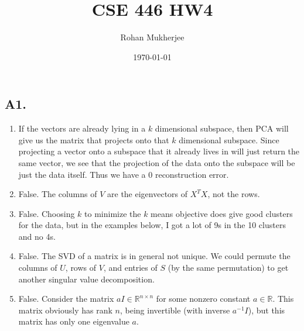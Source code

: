 \documentclass[12pt]{article}
\title{CSE 446 HW4}
\date{\today}
\author{Rohan Mukherjee}
\theoremstyle{definitionstyle}
\def\mbb#1{\mathbb{#1}}
\def \R{\mbb{R}}
\begin{document}
    \maketitle
    \subsection*{A1.}
    \begin{enumerate}[label=\alph*.]
        \item If the vectors are already lying in a $k$ dimensional subspace, then PCA will give us the matrix that projects onto that $k$ dimensional subspace. Since projecting a vector onto a subspace that it already lives in will just return the same vector, we see that the projection of the data onto the subspace will be just the data itself. Thus we have a 0 reconstruction error.
        \item False. The columns of $V$ are the eigenvectors of $X^TX$, not the rows. 
        \item False. Choosing $k$ to minimize the $k$ means objective does give good clusters for the data, but in the examples below, I got a lot of 9s in the 10 clusters and no 4s. 
        \item False. The SVD of a matrix is in general not unique. We could permute the columns of $U$, rows of $V$, and entries of $S$ (by the same permutation) to get another singular value decomposition. 
        \item False. Consider the matrix $aI \in \R^{n \times n}$ for some nonzero constant $a \in \R$. This matrix obviously has rank $n$, being invertible (with inverse $a^{-1} I$), but this matrix has only one eigenvalue $a$.
    \end{enumerate}

    \newpage
\end{document}
